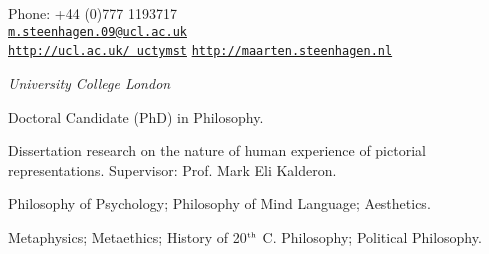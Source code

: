 \documentclass[11pt]{article}
\makeatletter
\def\myemail{m.steenhagen.09@ucl.ac.uk}
\def\myweb{http://ucl.ac.uk/\string~uctymst}
\def\myblog{http://maarten.steenhagen.nl}
\def\myphone{+44 (0)777 1193717}
\makeatother
\begin{document}
\begin{minipage}[t]{2.95in}
  
\end{minipage}
\hfill     
\hfill
\begin{minipage}[t]{1.7in}
  \flushright \footnotesize Phone: \myphone \\  
  {\scriptsize  \texttt{\href{mailto:\myemail}{\myemail}}} \\
  {\scriptsize  \texttt{\href{\myweb}{\myweb}}}
	{\scriptsize  \texttt{\href{\myblog}{\myblog}}}
\end{minipage}


\vfil

\reversemarginpar

\bigskip       

\medskip


\noindent\emph{University College London \vspace{0.01in}}

\ind Doctoral Candidate (PhD) in Philosophy.

\ind Dissertation research on the nature of human experience of pictorial representations. Supervisor: Prof. Mark Eli Kalderon.

\bigskip


\ind Philosophy of Psychology; Philosophy of Mind \amper Language; Aesthetics.

\bigskip


\ind Metaphysics; Metaethics; History of 20$^{\textrm{\tiny{th}}}$ C. Philosophy; Political Philosophy. 

\bigskip
\bigskip
\vfil 
{}
\end{document}
